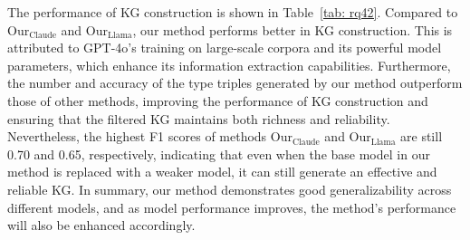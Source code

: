 The performance of KG construction is shown in Table~\ref{tab: rq42}.
Compared to Our$_{\text{Claude}}$ and Our$_{\text{Llama}}$, our method performs better in KG construction.
This is attributed to GPT-4o's training on large-scale corpora and its powerful model parameters, which enhance its information extraction capabilities.
Furthermore, the number and accuracy of the type triples generated by our method outperform those of other methods, improving the performance of KG construction and ensuring that the filtered KG maintains both richness and reliability.
Nevertheless, the highest F1 scores of methods Our$_{\text{Claude}}$ and Our$_{\text{Llama}}$ are still 0.70 and 0.65, respectively, indicating that even when the base model in our method is replaced with a weaker model, it can still generate an effective and reliable KG.
In summary, our method demonstrates good generalizability across different models, and as model performance improves, the method's performance will also be enhanced accordingly.

